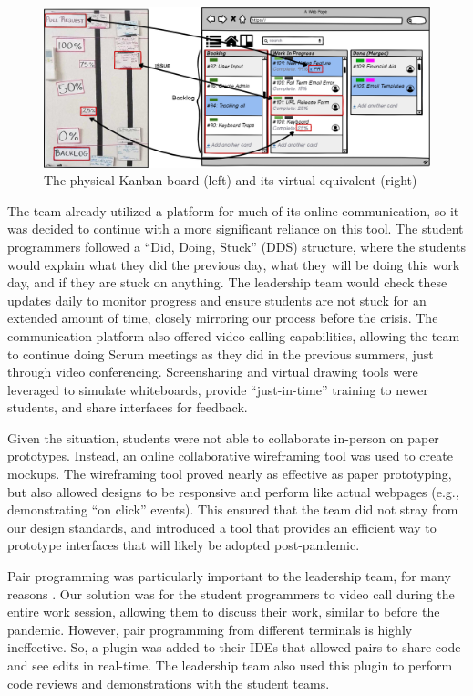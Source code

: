 \begin{figure}[h]
 \centering
 \includegraphics[width=1.0\linewidth]{updatedTrelloKanban.png}
 \caption{The physical Kanban board (left) and its virtual equivalent (right)}
 \label{fig:digitalkanban}
\end{figure}

The team already utilized a platform for much of its online communication, so it was decided to continue with a more significant reliance on this tool. The student programmers followed a ``Did, Doing, Stuck'' (DDS) structure, where the students would explain what they did the previous day, what they will be doing this work day, and if they are stuck on anything. The leadership team would check these updates daily to monitor progress and ensure students are not stuck for an extended amount of time, closely mirroring our process before the crisis. The communication platform also offered video calling capabilities, allowing the team to continue doing Scrum meetings as they did in the previous summers, just through video conferencing. Screensharing and virtual drawing tools were leveraged to simulate whiteboards,  provide ``just-in-time'' training to newer students, and share interfaces for feedback.

Given the situation, students were not able to collaborate in-person on paper prototypes. Instead, an online collaborative wireframing tool was used to create mockups. The wireframing tool proved nearly as effective as paper prototyping, but also allowed designs to be responsive and perform like actual webpages (e.g., demonstrating ``on click'' events). This ensured that the team did not stray from our design standards, and introduced a tool that provides an efficient way to prototype interfaces that will likely be adopted post-pandemic.

Pair programming was particularly important to the leadership team, for many reasons \cite{2002PairProgramming}. Our solution was for the student programmers to video call during the entire work session, allowing them to discuss their work, similar to before the pandemic. However, pair programming from different terminals is highly ineffective. So, a plugin was added to their IDEs that allowed pairs to share code and see edits in real-time. The leadership team also used this plugin to perform code reviews and demonstrations with the student teams.

